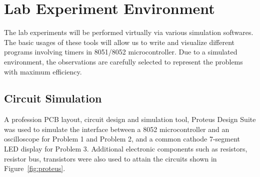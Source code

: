 \documentclass{lab_sheet}
\begin{document}
    \section{Lab Experiment Environment}
    The lab experiments will be performed virtually via various simulation softwares. The basic usages of these tools will allow us to write and visualize different programs involving timers in 8051/8052 microcontroller. Due to a simulated environment, the observations are carefully selected to represent the problems with maximum efficiency.
    \subsection{Circuit Simulation}
    A profession PCB layout, circuit design and simulation tool, Proteus Design Suite was used to simulate the interface between a 8052 microcontroller and an oscilloscope for Problem 1 and Problem 2, and a common cathode 7-segment LED display for Problem 3. Additional electronic components such as resistors, resistor bus, transistors were also used to attain the circuits shown in Figure~\ref{fig:proteus}.
\end{document}
